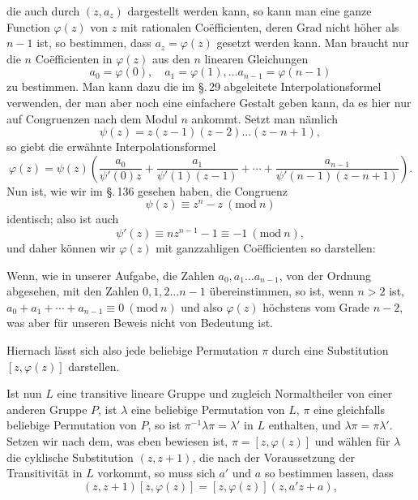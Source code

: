 
die auch durch $(z, a_z)$ dargestellt werden kann, so kann man eine ganze Function $\varphi(z)$ von $z$ mit rationalen Co\"efficienten, deren Grad nicht höher als $n - 1$ ist, so bestimmen, dass $a_z = \varphi(z)$ gesetzt werden kann. Man braucht nur die $n$ Co\"efficienten in $\varphi(z)$ aus den $n$ linearen Gleichungen
\[
a_0 = \varphi(0), \quad a_1 = \varphi(1), \ldots a_{n-1} = \varphi(n - 1)
\]
zu bestimmen. Man kann dazu die im \S.\,29 abgeleitete  Interpolationsformel verwenden, der man aber noch eine einfachere Gestalt geben kann, da es hier nur auf Congruenzen nach dem Modul $n$ ankommt. Setzt man nämlich
\[
\psi(z) = z(z - 1)(z - 2) \ldots (z - n + 1),
\]
so giebt die erwähnte Interpolationsformel
\[
\varphi(z) = \psi(z)\left(\frac{a_0}{\psi'(0) z} + \frac{a_1}{\psi'(1)(z - 1)} + \cdots + \frac{a_{n-1}}{\psi'(n-1)(z - n + 1)}\right).
\]
Nun ist, wie wir im \S.\,136 gesehen haben, die Congruenz
\[
\psi(z) \equiv z^n - z\ (\mathrm{mod}\ n)
\]
identisch; also ist auch
\[
\psi'(z) \equiv n z^{n-1} - 1 \equiv -1\ (\mathrm{mod}\ n),
\]
und daher können wir $\varphi(z)$ mit ganzzahligen Co\"efficienten so darstellen:

Wenn, wie in unserer Aufgabe, die Zahlen $a_0, a_1 \ldots a_{n-1}$, von der Ordnung abgesehen, mit den Zahlen $0, 1, 2 \ldots n - 1$ übereinstimmen, so ist, wenn $n > 2$ ist, $a_0 + a_1 + \cdots + a_{n-1} \equiv 0\ (\mathrm{mod}\ n)$ und also $\varphi(z)$ höchstens vom Grade $n - 2$, was aber für unseren Beweis nicht von Bedeutung ist.

Hiernach lässt sich also jede beliebige Permutation $\pi$ durch eine Substitution $[z, \varphi(z)]$ darstellen.

Ist nun $L$ eine transitive lineare Gruppe und zugleich Normaltheiler von einer anderen Gruppe $P$, ist $\lambda$ eine beliebige Permutation von $L$, $\pi$ eine gleichfalls beliebige Permutation von $P$, so ist $\pi^{-1}\lambda\pi = \lambda'$ in $L$ enthalten, und $\lambda\pi = \pi\lambda'$. Setzen wir nach dem, was eben bewiesen ist, $\pi = [z, \varphi(z)]$ und wählen für $\lambda$ die cyklische Substitution $(z, z + 1)$, die nach der Voraussetzung der Transitivität in $L$ vorkommt, so muss sich $a'$ und $a$ so bestimmen lassen, dass
\[
(z, z + 1)[z, \varphi(z)] = [z, \varphi(z)](z, a'z + a),
\]
